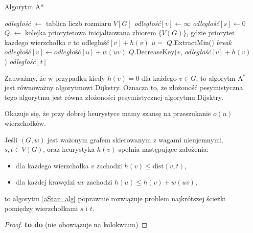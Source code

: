 \begin{algorithm}[H]
	\caption{Algorytm A*}
	\begin{algorithmic}[1]
		\State \textit{odległość} $\gets$ tablica liczb rozmiaru $V[G]$
		\State \textit{odległość}$[v]\gets\infty$
		\EndFor
		\State \textit{odległość}$[s]\gets 0$
		\State $Q$ $\gets$ kolejka priorytetowa inicjalizowana 
		zbiorem $\{V(G)\}$, gdzie priorytet każdego wierzchołka $v$
		to odległość$[v] + h(v)$
		\State $u =$ $Q$.ExtractMin()
		\State \textit{break}
		\EndIf
		\State $\textit{odległość}[v] \gets \textit{odległość}[u] + w(uv)$
		\State $Q$.DecreaseKey($v$, \textit{odległość}$[v] + h(v)$)
		\EndIf
		\EndFor
		\EndWhile
		\State \Return \textit{odległość}$[t]$
		\EndProcedure
	\end{algorithmic}
	\label{aStar_alg}
\end{algorithm}

Zauważmy, że w przypadku kiedy $h(v) = 0$ dla każdego $v \in G$, 
to algorytm A$^*$ jest równoważny algorytmowi Dijkstry. Oznacza to, że
złożoność pesymistyczna tego algorytmu jest równa złożoności
pesymistycznej algorytmu Dijsktry.

Okazuje się, że przy dobrej heurystyce mamy szansę na 
przeszukanie $o(n)$ wierzchołków. %

\begin{theorem}
	 Jeśli
	$(G, w)$ jest ważonym grafem skierowanym
	z wagami nieujemnymi,
	$s,t \in V(G)$, oraz heurystyka $h(v)$
	spełnia następujące założenia:
	\begin{itemize}
		\item dla każdego wierzchołka $v$ zachodzi $h(v) \leq \text{dist}(v, t)$,
		\item dla każdej krawędzi $uv$ zachodzi $h(u) \leq h(v) + w(uv)$,
	\end{itemize}
	to algorytm \ref{aStar_alg}
	poprawnie rozwiązuje problem najkrótszej ścieżki
	pomiędzy wierzchołkami $s$ i $t$.
	\begin{proof}
		\textbf{to do} (nie obowiązuje na kolokwium) %
	\end{proof}
	\label{aStar_proof}
\end{theorem}


